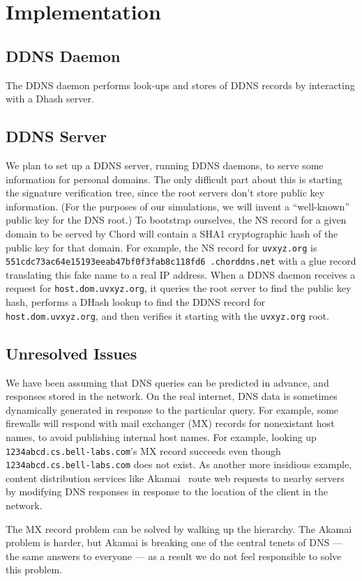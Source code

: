 \section{Implementation}

\subsection{DDNS Daemon}
The DDNS daemon 
performs look-ups and stores of DDNS records
by interacting with a Dhash server.

\subsection{DDNS Server}

We plan to set up a DDNS server, running DDNS daemons,
to serve some information for personal domains.
The only difficult part about this is starting the signature
verification tree, since the root servers don't store public
key information. (For the purposes of our simulations,
we will invent a ``well-known'' public key for the DNS root.)
To bootstrap ourselves,
the NS record for a given domain to be served
by Chord will contain a SHA1 cryptographic hash of the
public key for that domain.
For example, the NS record for {\tt uvxyz.org}
is {\tt 551cdc73ac64e15193eeab47bf0f3fab8c118fd6
.chorddns.net}
with a glue record translating this fake name to a real IP address.
When a DDNS daemon receives a request for {\tt host.dom.uvxyz.org},
it queries the root server to find the public key hash,
performs a DHash lookup to find the DDNS record for {\tt host.dom.uvxyz.org},
and then verifies it starting with the {\tt uvxyz.org} root.

\subsection{Unresolved Issues}

We have been assuming that DNS queries can be predicted in advance,
and responses stored in the network.
On the real internet, DNS data is sometimes dynamically generated in response
to the particular query.  
For example, some firewalls will respond with mail exchanger (MX) records
for nonexistant host names, to avoid publishing internal host names.
For example, looking up {\tt 1234abcd.cs.bell-labs.com}'s MX record
succeeds even though {\tt 1234abcd.cs.bell-labs.com} does not exist.
As another more insidious example, content distribution services like 
Akamai~\cite{akamai}
route web requests to nearby servers by modifying DNS responses in response
to the location of the client in the network.

The MX record problem can be solved by walking up the hierarchy.
The Akamai problem is harder, but Akamai is breaking one of the 
central tenets of DNS --- the same answers to everyone --- as a
result we do not feel responsible to solve this problem.
